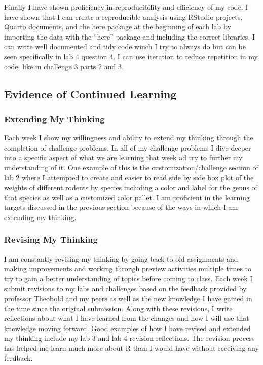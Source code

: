 \documentclass[
  letterpaper,
  DIV=11,
  numbers=noendperiod]{scrartcl}
\begin{document}
Finally I have shown proficiency in reproducibility and efficiency of my
code. I have shown that I can create a reproducible analysis using
RStudio projects, Quarto documents, and the here package at the
beginning of each lab by importing the data with the ``here'' package
and including the correct libraries. I can write well documented and
tidy code winch I try to always do but can be seen specifically in lab 4
question 4. I can use iteration to reduce repetition in my code, like in
challenge 3 parts 2 and 3.

\hypertarget{evidence-of-continued-learning}{%
\subsection{Evidence of Continued
Learning}\label{evidence-of-continued-learning}}

\hypertarget{extending-my-thinking}{%
\subsubsection{Extending My Thinking}\label{extending-my-thinking}}

Each week I show my willingness and ability to extend my thinking
through the completion of challenge problems. In all of my challenge
problems I dive deeper into a specific aspect of what we are learning
that week ad try to further my understanding of it. One example of this
is the customization/challenge section of lab 2 where I attempted to
create and easier to read side by side box plot of the weights of
different rodents by species including a color and label for the genus
of that species as well as a customized color pallet. I am proficient in
the learning targets discussed in the previous section because of the
ways in which I am extending my thinking.

\hypertarget{revising-my-thinking}{%
\subsubsection{Revising My Thinking}\label{revising-my-thinking}}

I am constantly revising my thinking by going back to old assignments
and making improvements and working through preview activities multiple
times to try to gain a better understanding of topics before coming to
class. Each week I submit revisions to my labs and challenges based on
the feedback provided by professor Theobold and my peers as well as the
new knowledge I have gained in the time since the original submission.
Along with these revisions, I write reflections about what I have
learned from the changes and how I will use that knowledge moving
forward. Good examples of how I have revised and extended my thinking
include my lab 3 and lab 4 revision reflections. The revision process
has helped me learn much more about R than I would have without
receiving any feedback.
\end{document}

